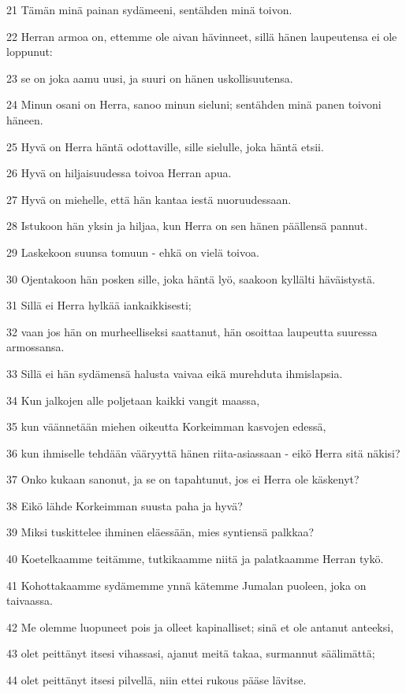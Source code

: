 \par 21 Tämän minä painan sydämeeni, sentähden minä toivon.
\par 22 Herran armoa on, ettemme ole aivan hävinneet, sillä hänen laupeutensa ei ole loppunut:
\par 23 se on joka aamu uusi, ja suuri on hänen uskollisuutensa.
\par 24 Minun osani on Herra, sanoo minun sieluni; sentähden minä panen toivoni häneen.
\par 25 Hyvä on Herra häntä odottaville, sille sielulle, joka häntä etsii.
\par 26 Hyvä on hiljaisuudessa toivoa Herran apua.
\par 27 Hyvä on miehelle, että hän kantaa iestä nuoruudessaan.
\par 28 Istukoon hän yksin ja hiljaa, kun Herra on sen hänen päällensä pannut.
\par 29 Laskekoon suunsa tomuun - ehkä on vielä toivoa.
\par 30 Ojentakoon hän posken sille, joka häntä lyö, saakoon kyllälti häväistystä.
\par 31 Sillä ei Herra hylkää iankaikkisesti;
\par 32 vaan jos hän on murheelliseksi saattanut, hän osoittaa laupeutta suuressa armossansa.
\par 33 Sillä ei hän sydämensä halusta vaivaa eikä murehduta ihmislapsia.
\par 34 Kun jalkojen alle poljetaan kaikki vangit maassa,
\par 35 kun väännetään miehen oikeutta Korkeimman kasvojen edessä,
\par 36 kun ihmiselle tehdään vääryyttä hänen riita-asiassaan - eikö Herra sitä näkisi?
\par 37 Onko kukaan sanonut, ja se on tapahtunut, jos ei Herra ole käskenyt?
\par 38 Eikö lähde Korkeimman suusta paha ja hyvä?
\par 39 Miksi tuskittelee ihminen eläessään, mies syntiensä palkkaa?
\par 40 Koetelkaamme teitämme, tutkikaamme niitä ja palatkaamme Herran tykö.
\par 41 Kohottakaamme sydämemme ynnä kätemme Jumalan puoleen, joka on taivaassa.
\par 42 Me olemme luopuneet pois ja olleet kapinalliset; sinä et ole antanut anteeksi,
\par 43 olet peittänyt itsesi vihassasi, ajanut meitä takaa, surmannut säälimättä;
\par 44 olet peittänyt itsesi pilvellä, niin ettei rukous pääse lävitse.
